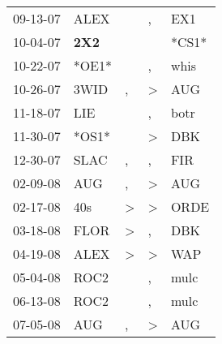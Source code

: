 \begin{supertabular}{p{0.07\textwidth}p{0.06\textwidth}p{0.02\textwidth}p{0.02\textwidth}p{0.06\textwidth}}
          09-13-07\textsuperscript{} &           ALEX\textsuperscript{} &                  &                , &            EX1\textsuperscript{} \\
          10-04-07\textsuperscript{} &   \textbf{2X2\textsuperscript{}} &                  &                  &                            *CS1* \\
          10-22-07\textsuperscript{} &                            *OE1* &                  &                , &           whis\textsuperscript{} \\
          10-26-07\textsuperscript{} &           3WID\textsuperscript{} &                , &     \textgreater &            AUG\textsuperscript{} \\
          11-18-07\textsuperscript{} &            LIE\textsuperscript{} &                  &                , &           botr\textsuperscript{} \\
          11-30-07\textsuperscript{} &                            *OS1* &                  &     \textgreater &            DBK\textsuperscript{} \\
          12-30-07\textsuperscript{} &           SLAC\textsuperscript{} &                , &                , &            FIR\textsuperscript{} \\
          02-09-08\textsuperscript{} &            AUG\textsuperscript{} &                , &     \textgreater &            AUG\textsuperscript{} \\
          02-17-08\textsuperscript{} &            40s\textsuperscript{} &     \textgreater &     \textgreater &           ORDE\textsuperscript{} \\
          03-18-08\textsuperscript{} &           FLOR\textsuperscript{} &     \textgreater &                , &            DBK\textsuperscript{} \\
          04-19-08\textsuperscript{} &           ALEX\textsuperscript{} &     \textgreater &     \textgreater &            WAP\textsuperscript{} \\
          05-04-08\textsuperscript{} &           ROC2\textsuperscript{} &                  &                , &           mulc\textsuperscript{} \\
          06-13-08\textsuperscript{} &           ROC2\textsuperscript{} &                  &                , &           mulc\textsuperscript{} \\
          07-05-08\textsuperscript{} &            AUG\textsuperscript{} &                , &     \textgreater &            AUG\textsuperscript{} \\

\end{supertabular}
